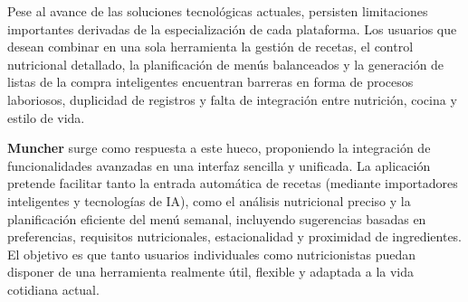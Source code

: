 Pese al avance de las soluciones tecnológicas actuales, persisten limitaciones importantes derivadas de la especialización de cada plataforma. Los usuarios que desean combinar en una sola herramienta la gestión de recetas, el control nutricional detallado, la planificación de menús balanceados y la generación de listas de la compra inteligentes encuentran barreras en forma de procesos laboriosos, duplicidad de registros y falta de integración entre nutrición, cocina y estilo de vida.

\textbf{Muncher} surge como respuesta a este hueco, proponiendo la integración de funcionalidades avanzadas en una interfaz sencilla y unificada. La aplicación pretende facilitar tanto la entrada automática de recetas (mediante importadores inteligentes y tecnologías de IA), como el análisis nutricional preciso y la planificación eficiente del menú semanal, incluyendo sugerencias basadas en preferencias, requisitos nutricionales, estacionalidad y proximidad de ingredientes. El objetivo es que tanto usuarios individuales como nutricionistas puedan disponer de una herramienta realmente útil, flexible y adaptada a la vida cotidiana actual.